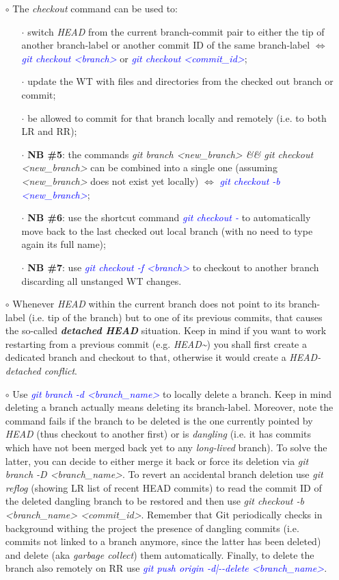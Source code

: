 \documentclass[a4paper,portrait,10pt]{article}   %
\newcommand{\mybulletlvA}{$\circ$}   %
\newcommand{\mybulletlvB}{$\cdot$}   %
\newcommand{\mydiv}{$\Leftrightarrow$ }   %
\newcommand{\mycmd}[1]{\textcolor{blue}{\textit{#1}}}   %
\newcommand{\myparvspace}{\vspace{4mm}}   %
\begin{document}
\begin{itemize}
\item[\mybulletlvA] The \textit{checkout} command can be used to:
\begin{itemize}
  \item[\mybulletlvB] switch \textit{HEAD} from the current branch-commit pair to either the tip of another branch-label or another commit ID of the same branch-label \mydiv \mycmd{git checkout <branch>} or \mycmd{git checkout <commit\_id>};
  \item[\mybulletlvB] update the WT with files and directories from the checked out branch or commit;
  \item[\mybulletlvB] be allowed to commit for that branch locally and remotely (i.e. to both LR and RR);
  \item[\mybulletlvB] \textbf{NB \#5}: the commands \textit{git branch <new\_branch> \&\& git checkout <new\_branch>} can be combined into a single one (assuming \textit{<new\_branch>} does not exist yet locally) \mydiv \mycmd{git checkout -b <new\_branch>};
  \item[\mybulletlvB] \textbf{NB \#6}: use the shortcut command \mycmd{git checkout -} to automatically move back to the last checked out local branch (with no need to type again its full name);
  \item[\mybulletlvB] \textbf{NB \#7}: use \mycmd{git checkout -f <branch>} to checkout to another branch discarding all unstanged WT changes.
\end{itemize}
\myparvspace

\item[\mybulletlvA] Whenever \textit{HEAD} within the current branch does not point to its branch-label (i.e. tip of the branch) but to one of its previous commits, that causes the so-called \textbf{\textit{detached HEAD}} situation. Keep in mind if you want to work restarting from a previous commit (e.g. \textit{HEAD\textasciitilde}) you shall first create a dedicated branch and checkout to that, otherwise it would create a \textit{HEAD-detached conflict}.
\myparvspace

\item[\mybulletlvA] Use \mycmd{git branch -d <branch\_name>} to locally delete a branch. Keep in mind deleting a branch actually means deleting its branch-label. Moreover, note the command fails if the branch to be deleted is the one currently pointed by \textit{HEAD} (thus checkout to another first) or is \textit{dangling} (i.e. it has commits which have not been merged back yet to any \textit{long-lived} branch). To solve the latter, you can decide to either merge it back or force its deletion via \textit{git branch -D <branch\_name>}. To revert an accidental branch deletion use \textit{git reflog} (showing LR list of recent HEAD commits) to read the commit ID of the deleted dangling branch to be restored and then use \textit{git checkout -b <branch\_name> <commit\_id>}. Remember that Git periodically checks in background withing the project the presence of dangling commits (i.e. commits not linked to a branch anymore, since the latter has been deleted) and delete (aka \textit{garbage collect}) them automatically. Finally, to delete the branch also remotely on RR use \mycmd{git push origin -d|-{}-delete <branch\_name>}.
\end{itemize}
\end{document}
